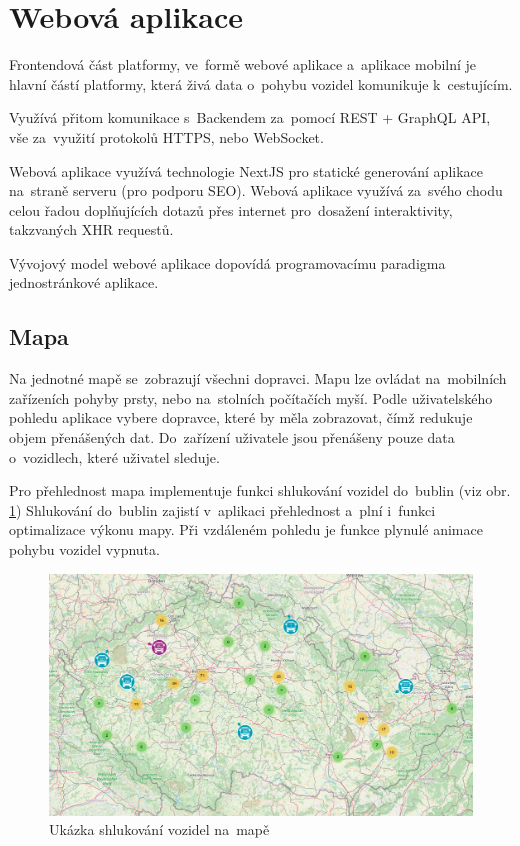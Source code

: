 \section{Webová aplikace}

Frontendová část platformy, ve~formě webové aplikace a~aplikace mobilní je hlavní částí platformy, která živá data o~pohybu vozidel komunikuje k~cestujícím.

Využívá přitom komunikace s~Backendem za~pomocí REST + GraphQL API, vše za~využití protokolů HTTPS, nebo WebSocket.

Webová aplikace využívá technologie NextJS pro statické generování aplikace na~straně serveru (pro podporu SEO). Webová aplikace využívá za~svého chodu celou řadou doplňujících dotazů přes internet pro~dosažení interaktivity, takzvaných XHR requestů.

Vývojový model webové aplikace dopovídá programovacímu paradigma jednostránkové aplikace. \cite{singlepageapp}

\subsection{Mapa}
Na jednotné mapě se~zobrazují všechni dopravci. Mapu lze ovládat na~mobilních zařízeních pohyby prsty, nebo na~stolních počítačích myší. Podle uživatelského pohledu aplikace vybere dopravce, které by měla zobrazovat, čímž redukuje objem přenášených dat. Do~zařízení uživatele jsou přenášeny pouze data o~vozidlech, které uživatel sleduje.

Pro přehlednost mapa implementuje funkci shlukování vozidel do~bublin (viz obr. \ref{shlukovani}) Shlukování do~bublin zajistí v~aplikaci přehlednost a~plní i~funkci optimalizace výkonu mapy. Při vzdáleném pohledu je funkce plynulé animace pohybu vozidel vypnuta.
\begin{figure}[H]
    \centering
    \includegraphics[width=1\textwidth]{images/global_map.png}
    \caption{Ukázka shlukování vozidel na~mapě}
    \label{shlukovani}
\end{figure}
